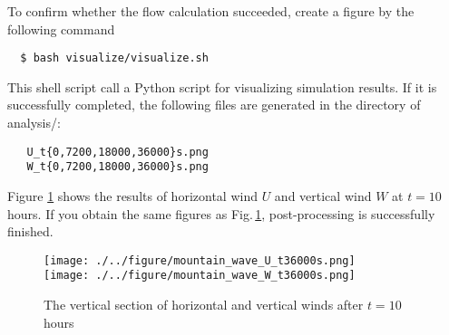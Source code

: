 To confirm whether the flow calculation succeeded,
create a figure by the following command 
\begin{verbatim}
  $ bash visualize/visualize.sh
\end{verbatim}
This shell script call a Python script for visualizing simulation results. 
If it is successfully completed, 
the following files are generated in the directory of analysis/:

\begin{verbatim}
   U_t{0,7200,18000,36000}s.png
   W_t{0,7200,18000,36000}s.png
\end{verbatim}
Figure \ref{fig_ideal} shows the results of horizontal wind $U$ and vertical wind $W$ at $t=10$ hours.
If you obtain the same figures as Fig.\,\ref{fig_ideal}, 
post-processing is successfully finished.

\begin{figure}[htb]
\begin{center}
  \texttt{[image: ./../figure/mountain\_wave\_U\_t36000s.png]}\\
  \texttt{[image: ./../figure/mountain\_wave\_W\_t36000s.png]}\\
  \caption{The vertical section of horizontal and vertical winds after $t=10$ hours}
  \label{fig_ideal}
\end{center}
\end{figure}

